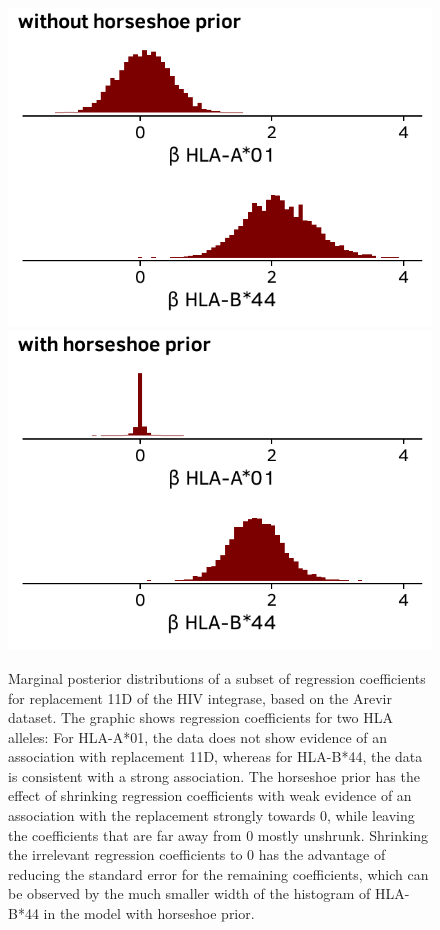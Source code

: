 \documentclass{bioinfo}
\begin{document}
\begin{figure}
  \includegraphics[width=1\linewidth]{plots/without_horseshoe.pdf}
  \includegraphics[width=1\linewidth]{plots/with_horseshoe.pdf}
  \caption{Marginal posterior distributions of a subset of regression coefficients for replacement 11D of the HIV integrase, based on the Arevir dataset. The graphic shows regression coefficients for two HLA alleles: For HLA-A*01, the data does not show evidence of an association with replacement 11D, whereas for HLA-B*44, the data is consistent with a strong association. The horseshoe prior has the effect of shrinking regression coefficients with weak evidence of an association with the replacement strongly towards 0, while leaving the coefficients that are far away from 0 mostly unshrunk. Shrinking the irrelevant regression coefficients to 0 has the advantage of reducing the standard error for the remaining coefficients, which can be observed by the much smaller width of the histogram of HLA-B*44 in the model with horseshoe prior.}
  \label{fig:horseshoe-comparison}
\end{figure}
\end{document}
